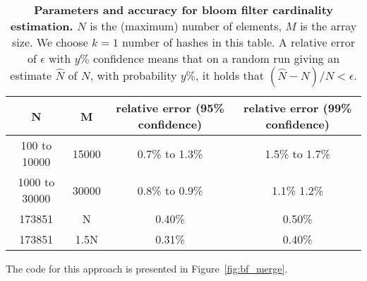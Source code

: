 \begin{table}[t]
\begin{center}
\begin{tabular}{cccc}
\toprule
N & M & relative error (95\% confidence) & relative error (99\% confidence)\\
\midrule
 100 to 10000 & 15000 & 0.7\% to 1.3\% & 1.5\% to 1.7\% \\   
1000 to 30000 & 30000 & 0.8\%  to 0.9\% & 1.1\% 1.2\%\\ 
 173851 & N &  0.40\% & 0.50\% \\   
 173851 & 1.5N & 0.31\% & 0.40\% \\   
\bottomrule
\end{tabular}
\end{center}
\caption{{\bf Parameters and accuracy for bloom filter cardinality estimation.}
$N$ is the (maximum) number of elements, $M$ is the array size.
We choose $k=1$ number of hashes in this table.
A relative error of $\epsilon$ 
with $y\%$ confidence means
that on a random run giving an estimate $\hat{N}$ of $N$, 
with probability $y\%$,  
it holds that $(\hat{N}-N)/N < \epsilon$.
}
\end{table}


The code for this approach is presented in Figure~\ref{fig:bf_merge}.

